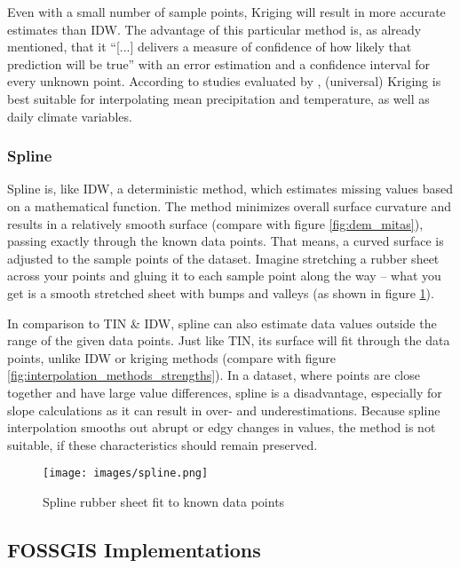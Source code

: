 Even with a small number of sample points, Kriging will result in more accurate estimates than IDW. \cite{lam_spatial_2009} The advantage of this particular method is, as already mentioned, that it “[...] delivers a measure of confidence of how likely that prediction will be true” with an error estimation and a confidence interval for every unknown point. \cite{lam_spatial_2009} According to studies evaluated by \citeauthor{hofstra_comparison_2008}, (universal) Kriging is best suitable for interpolating mean precipitation and temperature, as well as daily climate variables. 

\subsubsection{Spline}

Spline is, like IDW, a deterministic method, which estimates missing values based on a mathematical function. The method minimizes overall \ldq{}surface curvature\rdq{} and results in a relatively smooth surface (compare with figure \ref{fig:dem_mitas}), passing exactly through the known data points. \cite{samanta_interpolation_2012} That means, a curved surface is adjusted to the sample points of the dataset. \ldq{}Imagine stretching a rubber sheet across your points and gluing it to each sample point along the way -- what you get is a smooth stretched sheet with bumps and valleys\rdq{} (as shown in figure \ref{fig:spline}). \cite{wasser_going_2020}

In comparison to TIN \& IDW, spline can also estimate data values outside the range of the given data points. Just like TIN, its surface will fit through the data points, unlike IDW or kriging methods (compare with figure \ref{fig:interpolation_methods_strengths}). In a dataset, where points are close together and have large value differences, spline is a disadvantage, especially for slope calculations as it can result in over- and underestimations. \cite{wasser_going_2020} Because spline interpolation smooths out abrupt or \ldq{}edgy\rdq{} changes in values, the method is not suitable, if these characteristics should remain preserved.

\begin{figure}
	\centering
	\texttt{[image: images/spline.png]}
	\caption{Spline \ldq{}rubber sheet\rdq{} fit to known data points \cite{albrecht_spline_2005}}
	\label{fig:spline}
\end{figure}


\subsection{FOSSGIS Implementations}

